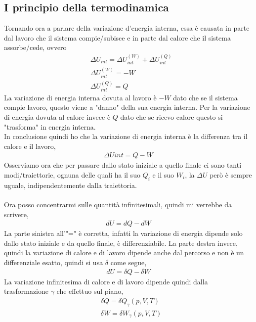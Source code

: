     \subsection{I principio della termodinamica}
        Tornando ora a parlare della variazione d'energia interna, essa è causata in parte dal lavoro che il sistema compie/subisce e in parte dal calore che il sistema assorbe/cede, ovvero
        \begin{align*}
            &\Delta U_{int} = \Delta U_{int}^{(W)} + \Delta U_{int}^{(Q)}\\
            &\Delta U_{int}^{(W)}=-W\\
            &\Delta U_{int}^{(Q)}=Q
        \end{align*}
        La variazione di energia interna dovuta al lavoro è $-W$ dato che se il sistema compie lavoro, questo viene a "danno" della sua energia interna. Per la variazione di energia dovuta al calore invece è $Q$ dato che se ricevo calore questo si "trasforma" in energia interna.\\
        In conclusione quindi ho che la variazione di energia interna è la differenza tra il calore e il lavoro,
        \begin{align*}
            \Delta U{int} = Q - W
        \end{align*}
        Osserviamo ora che per passare dallo stato iniziale a quello finale ci sono tanti modi/traiettorie, ognuna delle quali ha il suo $Q_i$ e il suo $W_i$, la $\Delta U$ però è sempre uguale, indipendentemente dalla traiettoria.\\\\
        Ora posso concentrarmi sulle quantità infinitesimali, quindi mi verrebbe da scrivere,
        \begin{align*}
            dU = dQ - dW
        \end{align*}
        La parte sinistra all'"=" è corretta, infatti la variazione di energia dipende solo dallo stato iniziale e da quello finale, è differenziabile. La parte destra invece, quindi la variazione di calore e di lavoro dipende anche dal percorso e non è un differenziale esatto, quindi si usa $\delta$ come segue,
        \begin{align*}
            dU = \delta Q - \delta W
        \end{align*}
        La variazione infinitesima di calore e di lavoro dipende quindi dalla trasformazione $\gamma$ che effettuo sul piano,
        \begin{align*}
            &\delta Q = \delta Q_{\gamma}(p, V, T)\\
            &\delta W = \delta W_{\gamma}(p, V, T)
        \end{align*}

